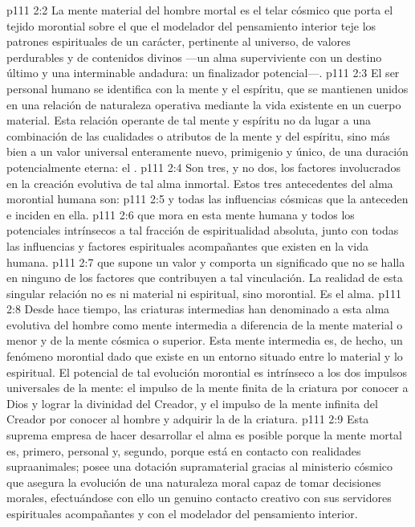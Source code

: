 \vs p111 2:2 La mente material del hombre mortal es el telar cósmico que porta el tejido morontial sobre el que el modelador del pensamiento interior teje los patrones espirituales de un carácter, pertinente al universo, de valores perdurables y de contenidos divinos ---un alma superviviente con un destino último y una interminable andadura: un finalizador potencial---.
\vs p111 2:3 El ser personal humano se identifica con la mente y el espíritu, que se mantienen unidos en una relación de naturaleza operativa mediante la vida existente en un cuerpo material. Esta relación operante de tal mente y espíritu no da lugar a una combinación de las cualidades o atributos de la mente y del espíritu, sino más bien a un valor universal enteramente nuevo, primigenio y único, de una duración potencialmente eterna: el .
\vs p111 2:4 \pc Son tres, y no dos, los factores involucrados en la creación evolutiva de tal alma inmortal. Estos tres antecedentes del alma morontial humana son:
\vs p111 2:5  y todas las influencias cósmicas que la anteceden e inciden en ella.
\vs p111 2:6  que mora en esta mente humana y todos los potenciales intrínsecos a tal fracción de espiritualidad absoluta, junto con todas las influencias y factores espirituales acompañantes que existen en la vida humana.
\vs p111 2:7  que supone un valor y comporta un significado que no se halla en ninguno de los factores que contribuyen a tal vinculación. La realidad de esta singular relación no es ni material ni espiritual, sino morontial. Es el alma.
\vs p111 2:8 \pc Desde hace tiempo, las criaturas intermedias han denominado a esta alma evolutiva del hombre como mente intermedia a diferencia de la mente material o menor y de la mente cósmica o superior. Esta mente intermedia es, de hecho, un fenómeno morontial dado que existe en un entorno situado entre lo material y lo espiritual. El potencial de tal evolución morontial es intrínseco a los dos impulsos universales de la mente: el impulso de la mente finita de la criatura por conocer a Dios y lograr la divinidad del Creador, y el impulso de la mente infinita del Creador por conocer al hombre y adquirir la  de la criatura.
\vs p111 2:9 Esta suprema empresa de hacer desarrollar el alma es posible porque la mente mortal es, primero, personal y, segundo, porque está en contacto con realidades supraanimales; posee una dotación supramaterial gracias al ministerio cósmico que asegura la evolución de una naturaleza moral capaz de tomar decisiones morales, efectuándose con ello un genuino contacto creativo con sus servidores espirituales acompañantes y con el modelador del pensamiento interior.
